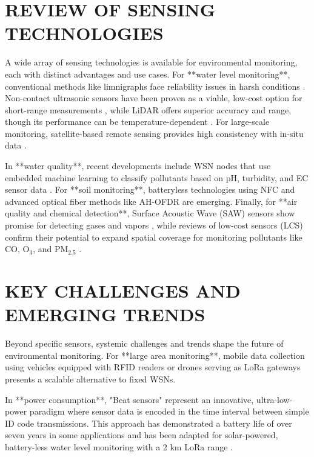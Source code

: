 \section{REVIEW OF SENSING TECHNOLOGIES}
A wide array of sensing technologies is available for environmental monitoring, each with distinct advantages and use cases. For **water level monitoring**, conventional methods like limnigraphs face reliability issues in harsh conditions \cite{santana_2024_development}. Non-contact ultrasonic sensors have been proven as a viable, low-cost option for short-range measurements \cite{mohammadrezamasoudimoghaddam_2024_a}, while LiDAR offers superior accuracy and range, though its performance can be temperature-dependent \cite{paul_2020_a}. For large-scale monitoring, satellite-based remote sensing provides high consistency with in-situ data \cite{jiang_2024_monitoring, ali_2024_satellite}.

In **water quality**, recent developments include WSN nodes that use embedded machine learning to classify pollutants based on pH, turbidity, and EC sensor data \cite{ferreira_2023_conception}. For **soil monitoring**, batteryless technologies using NFC \cite{boada_2018_batteryless} and advanced optical fiber methods like AH-OFDR \cite{sun_2024_highresolution} are emerging. Finally, for **air quality and chemical detection**, Surface Acoustic Wave (SAW) sensors show promise for detecting gases and vapors \cite{devkota_2017_saw}, while reviews of low-cost sensors (LCS) confirm their potential to expand spatial coverage for monitoring pollutants like CO, O$_3$, and PM$_{2.5}$ \cite{karagulian_2019_review}.

\section{KEY CHALLENGES AND EMERGING TRENDS}
Beyond specific sensors, systemic challenges and trends shape the future of environmental monitoring. For **large area monitoring**, mobile data collection using vehicles equipped with RFID readers \cite{deng_2020_novel} or drones serving as LoRa gateways \cite{caruso_2021_drone} presents a scalable alternative to fixed WSNs.

In **power consumption**, "Beat sensors" represent an innovative, ultra-low-power paradigm where sensor data is encoded in the time interval between simple ID code transmissions. This approach has demonstrated a battery life of over seven years in some applications and has been adapted for solar-powered, battery-less water level monitoring with a 2 km LoRa range \cite{ishibashi_2017_beat, ishibashi_2019_long, dao_2025_lowcost}.

